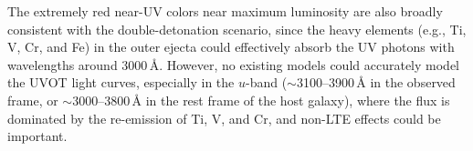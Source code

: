 \documentclass[twocolumn]{aastex631}
\begin{document}
\begin{CJK*}{UTF8}{gbsn}

The extremely red near-UV colors near maximum luminosity are also broadly consistent with the double-detonation scenario, since the heavy elements (e.g., Ti, V, Cr, and Fe) in the outer ejecta could effectively absorb the UV photons with wavelengths around 3000\,\r{A}. %
However, no existing models could accurately model the UVOT light curves, especially in the $u$-band ($\sim$3100--3900\,\r{A} in the observed frame, or $\sim$3000--3800\,\r{A} in the rest frame of the host galaxy), where the flux is dominated by the re-emission of Ti, V, and Cr, and non-LTE effects could be important.


\end{CJK*}
\end{document}
